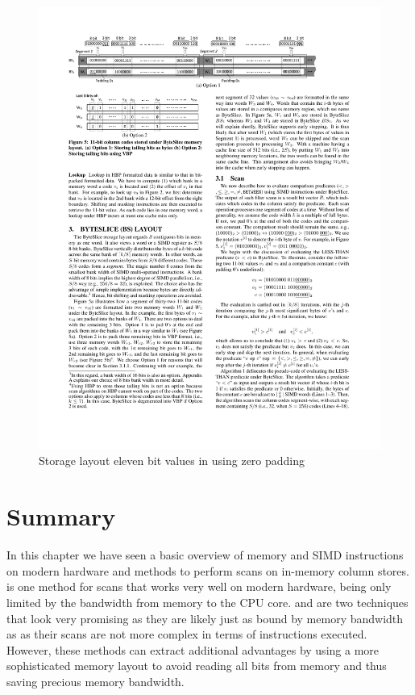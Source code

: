 \begin{figure}[h] \begin{center}
\includegraphics[scale=1]{images/bytesliceelevenbits}
\end{center}
\caption{Storage layout eleven bit values in \bs{} using zero padding~\cite{ByteSlice}}
\label{fig:bseleven}
\end{figure}

\section{Summary}

In this chapter we have seen a basic overview of memory and SIMD instructions on
modern hardware and methods to perform scans on in-memory column stores.
\simdscan{} is one method for scans that works very well on modern hardware,
being only limited by the bandwidth from memory to the CPU core. \bwv{} and
\bs{} are two techniques that look very promising as they are likely just as
bound by memory bandwidth as \simdscan{} as their scans are not more complex in
terms of instructions executed. However, these methods can extract additional
advantages by using a more sophisticated memory layout to avoid reading all bits
from memory and thus saving precious memory bandwidth.

